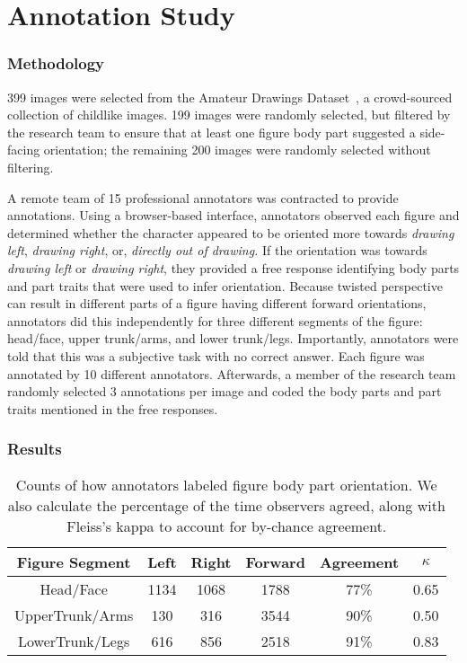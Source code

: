 

\section{Annotation Study}

\subsubsection{Methodology}
399 images were selected from the Amateur Drawings Dataset~\cite{10.1145/3592788}, a crowd-sourced collection of childlike images. 199 images were randomly selected, but filtered by the research team to ensure that at least one figure body part suggested a side-facing orientation; the remaining 200 images were randomly selected without filtering.

A remote team of 15 professional annotators was contracted to provide annotations.
Using a browser-based interface, annotators observed each figure and determined whether the character appeared to be oriented more towards \textit{drawing left}, \textit{drawing right}, or, \textit{directly out of drawing.} 
If the orientation was towards \textit{drawing left} or \textit{drawing right}, they provided a free response identifying body parts and part traits that were used to infer orientation.
Because twisted perspective can result in different parts of a figure having different forward orientations, annotators did this independently for three different segments of the figure: head/face, upper trunk/arms, and lower trunk/legs.
Importantly, annotators were told that this was a subjective task with no correct answer.
Each figure was annotated by 10 different annotators.
Afterwards, a member of the research team randomly selected 3 annotations per image and coded the body parts and part traits mentioned in the free responses.



\subsubsection{Results}
\begin{table}[ht]
\small %
\centering
\begin{tabular}{|c|c|c|c|c|c|}
\hline
Figure Segment & Left & Right & Forward & Agreement & $\kappa$ \\
\hline
Head/Face & 1134 & 1068 & 1788 & 77\% & 0.65 \\
\hline
UpperTrunk/Arms & 130 & 316 & 3544 & 90\% & 0.50 \\
\hline
LowerTrunk/Legs & 616 & 856 & 2518 & 91\% & 0.83 \\
\hline
\end{tabular}
\caption{
Counts of how annotators labeled figure body part orientation.
We also calculate the percentage of the time observers agreed, along with Fleiss's kappa to account for by-chance agreement.
}
\label{table:annotation_orientation_frequency}
\end{table}



